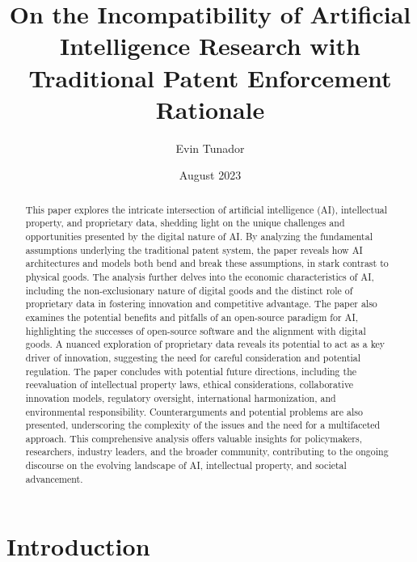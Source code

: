 \documentclass{article}[10pt]
\title{On the Incompatibility of Artificial Intelligence Research with Traditional Patent Enforcement Rationale}
\author{Evin Tunador}
\date{August 2023}
\begin{document}
\fancyhead{} %
\renewcommand{\headrulewidth}{0pt}

\maketitle

\begin{abstract}
    This paper explores the intricate intersection of artificial intelligence (AI), intellectual property, and proprietary data, shedding light on the unique challenges and opportunities presented by the digital nature of AI. 
    By analyzing the fundamental assumptions underlying the traditional patent system, the paper reveals how AI architectures and models both bend and break these assumptions, in stark contrast to physical goods. 
    The analysis further delves into the economic characteristics of AI, including the non-exclusionary nature of digital goods and the distinct role of proprietary data in fostering innovation and competitive advantage. 
    The paper also examines the potential benefits and pitfalls of an open-source paradigm for AI, highlighting the successes of open-source software and the alignment with digital goods. 
    A nuanced exploration of proprietary data reveals its potential to act as a key driver of innovation, suggesting the need for careful consideration and potential regulation. 
    The paper concludes with potential future directions, including the reevaluation of intellectual property laws, ethical considerations, collaborative innovation models, regulatory oversight, international harmonization, and environmental responsibility. 
    Counterarguments and potential problems are also presented, underscoring the complexity of the issues and the need for a multifaceted approach. 
    This comprehensive analysis offers valuable insights for policymakers, researchers, industry leaders, and the broader community, contributing to the ongoing discourse on the evolving landscape of AI, intellectual property, and societal advancement. 
\end{abstract}

\newpage
\tableofcontents
\newpage

\section{Introduction}
\end{document}
